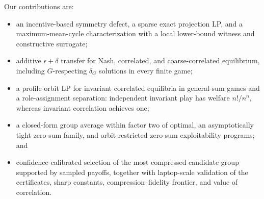 Our contributions are:
\begin{itemize}
    \item an incentive-based symmetry defect, a sparse exact projection LP, and a maximum-mean-cycle characterization with a local lower-bound witness and constructive surrogate;
    \item additive $\epsilon+\delta$ transfer for Nash, correlated, and coarse-correlated equilibrium, including $G$-respecting $\delta_G$ solutions in every finite game;
    \item a profile-orbit LP for invariant correlated equilibria in general-sum games and a role-assignment separation: independent invariant play has welfare $n!/n^n$, whereas invariant correlation achieves one;
    \item a closed-form group average within factor two of optimal, an asymptotically tight zero-sum family, and orbit-restricted zero-sum exploitability programs; and
    \item confidence-calibrated selection of the most compressed candidate group supported by sampled payoffs, together with laptop-scale validation of the certificates, sharp constants, compression--fidelity frontier, and value of correlation.
\end{itemize}

